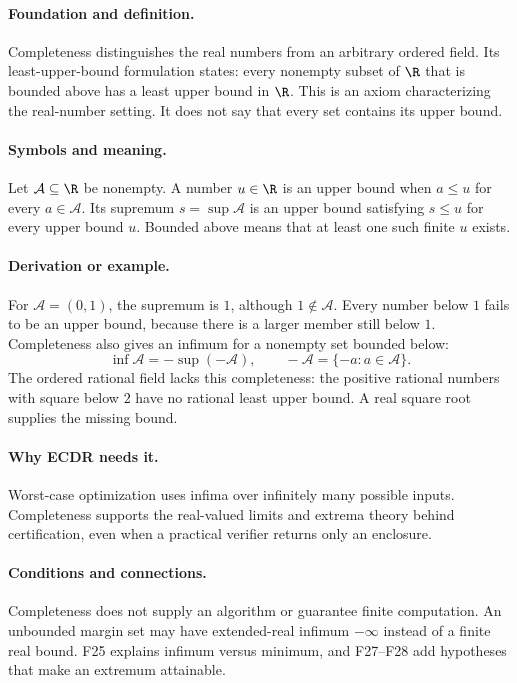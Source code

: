 \paragraph{Foundation and definition.}
Completeness distinguishes the real numbers from an arbitrary ordered
field. Its least-upper-bound formulation states: every nonempty subset
of $\R$ that is bounded above has a least upper bound in $\R$. This is
an axiom characterizing the real-number setting. It does not say that
every set contains its upper bound.
\paragraph{Symbols and meaning.}
Let $\mathcal A\subseteq\R$ be nonempty. A number $u\in\R$ is an
upper bound when $a\le u$ for every $a\in\mathcal A$. Its supremum
$s=\sup\mathcal A$ is an upper bound satisfying $s\le u$ for every
upper bound $u$. Bounded above means that at least one such finite $u$
exists.
\paragraph{Derivation or example.}
For $\mathcal A=(0,1)$, the supremum is $1$, although
$1\notin\mathcal A$. Every number below $1$ fails to be an upper bound,
because there is a larger member still below $1$.
Completeness also gives an infimum for a nonempty set bounded below:
\[
 \inf\mathcal A=-\sup(-\mathcal A),\qquad
 -\mathcal A=\{-a:a\in\mathcal A\}.
\]
The ordered rational field lacks this completeness: the positive
rational numbers with square below $2$ have no rational least upper
bound. A real square root supplies the missing bound.
\paragraph{Why ECDR needs it.}
Worst-case optimization uses infima over infinitely many possible inputs.
Completeness supports the real-valued limits and extrema theory behind
certification, even when a practical verifier returns only an enclosure.
\paragraph{Conditions and connections.}
Completeness does not supply an algorithm or guarantee finite computation.
An unbounded margin set may have extended-real infimum $-\infty$ instead
of a finite real bound. F25 explains infimum versus minimum, and
F27--F28 add hypotheses that make an extremum attainable.

